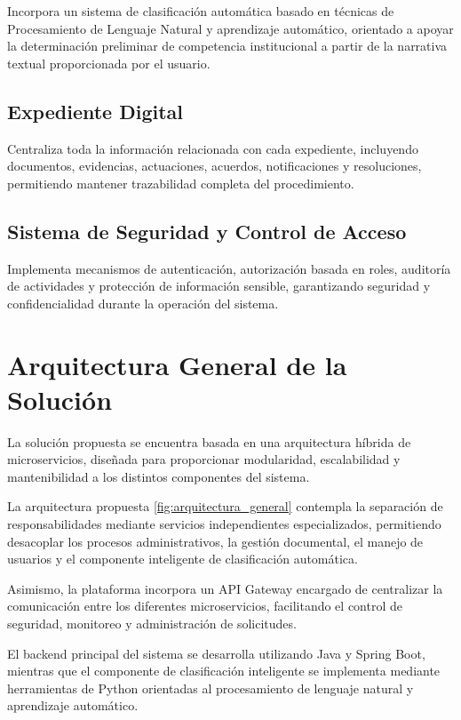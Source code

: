 Incorpora un sistema de clasificación automática basado en técnicas de Procesamiento de Lenguaje Natural y aprendizaje automático, orientado a apoyar la determinación preliminar de competencia institucional a partir de la narrativa textual proporcionada por el usuario.

\subsection{Expediente Digital}

Centraliza toda la información relacionada con cada expediente, incluyendo documentos, evidencias, actuaciones, acuerdos, notificaciones y resoluciones, permitiendo mantener trazabilidad completa del procedimiento.

\subsection{Sistema de Seguridad y Control de Acceso}

Implementa mecanismos de autenticación, autorización basada en roles, auditoría de actividades y protección de información sensible, garantizando seguridad y confidencialidad durante la operación del sistema.

\section{Arquitectura General de la Solución}

La solución propuesta se encuentra basada en una arquitectura híbrida de microservicios, diseñada para proporcionar modularidad, escalabilidad y mantenibilidad a los distintos componentes del sistema.

La arquitectura propuesta \ref{fig:arquitectura_general} contempla la separación de responsabilidades mediante servicios independientes especializados, permitiendo desacoplar los procesos administrativos, la gestión documental, el manejo de usuarios y el componente inteligente de clasificación automática.

Asimismo, la plataforma incorpora un API Gateway encargado de centralizar la comunicación entre los diferentes microservicios, facilitando el control de seguridad, monitoreo y administración de solicitudes.

El backend principal del sistema se desarrolla utilizando Java y Spring Boot, mientras que el componente de clasificación inteligente se implementa mediante herramientas de Python orientadas al procesamiento de lenguaje natural y aprendizaje automático.

